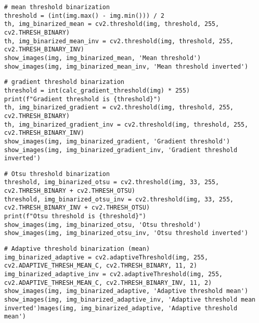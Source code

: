 \begin{lstlisting}[caption={Исходный код бинаризации по среднему значению}, label={lst:mean_threshold}]
# mean threshold binarization
threshold = (int(img.max() - img.min())) / 2
th, img_binarized_mean = cv2.threshold(img, threshold, 255, cv2.THRESH_BINARY)
th, img_binarized_mean_inv = cv2.threshold(img, threshold, 255, cv2.THRESH_BINARY_INV)
show_images(img, img_binarized_mean, 'Mean threshold')
show_images(img, img_binarized_mean_inv, 'Mean threshold inverted')
\end{lstlisting}

\begin{lstlisting}[caption={Исходный код для бинаризации по модулю градиента}, label={lst:gradient_threshold}]
# gradient threshold binarization
threshold = int(calc_gradient_threshold(img) * 255)
print(f"Gradient threshold is {threshold}")
th, img_binarized_gradient = cv2.threshold(img, threshold, 255, cv2.THRESH_BINARY)
th, img_binarized_gradient_inv = cv2.threshold(img, threshold, 255, cv2.THRESH_BINARY_INV)
show_images(img, img_binarized_gradient, 'Gradient threshold')
show_images(img, img_binarized_gradient_inv, 'Gradient threshold inverted')
\end{lstlisting}

\begin{lstlisting}[caption={Исходный код для бинаризации на основе метода Отсу}, label={lst:otsu_threshold}]
# Otsu threshold binarization
threshold, img_binarized_otsu = cv2.threshold(img, 33, 255, cv2.THRESH_BINARY + cv2.THRESH_OTSU)
threshold, img_binarized_otsu_inv = cv2.threshold(img, 33, 255, cv2.THRESH_BINARY_INV + cv2.THRESH_OTSU)
print(f"Otsu threshold is {threshold}")
show_images(img, img_binarized_otsu, 'Otsu threshold')
show_images(img, img_binarized_otsu_inv, 'Otsu threshold inverted')
\end{lstlisting}

\begin{lstlisting}[caption={Исходный код функции для адаптивной бинаризации (по среднему)}, label={lst:adaptive_mean}]
# Adaptive threshold binarization (mean)
img_binarized_adaptive = cv2.adaptiveThreshold(img, 255, cv2.ADAPTIVE_THRESH_MEAN_C, cv2.THRESH_BINARY, 11, 2)
img_binarized_adaptive_inv = cv2.adaptiveThreshold(img, 255, cv2.ADAPTIVE_THRESH_MEAN_C, cv2.THRESH_BINARY_INV, 11, 2)
show_images(img, img_binarized_adaptive, 'Adaptive threshold mean')
show_images(img, img_binarized_adaptive_inv, 'Adaptive threshold mean inverted')mages(img, img_binarized_adaptive, 'Adaptive threshold mean')
\end{lstlisting}

